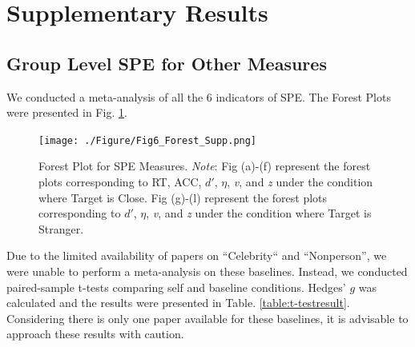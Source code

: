 \documentclass[sn-apa]{sn-jnl}%
\theoremstyle{thmstyleone}%
\theoremstyle{thmstyletwo}%
\theoremstyle{thmstylethree}%
\begin{document}
\section{Supplementary Results}\label{Results}

\subsection{Group Level SPE for Other Measures}\label{sec:meta}
We conducted a meta-analysis of all the 6 indicators of SPE. The Forest Plots were presented in Fig. \ref{fig:Meta_Result}. 
\clearpage
\begin{figure}[!ht]
	\centering
	\texttt{[image: ./Figure/Fig6\_Forest\_Supp.png]}
	\caption[Forest Plot for SPE Measures]{Forest Plot for SPE Measures. \textit{Note}: Fig (a)-(f) represent the forest plots corresponding to RT, ACC, $d'$, $\eta$, \textit{v}, and \textit{z} under the condition where Target is Close. Fig (g)-(l) represent the forest plots corresponding to $d'$, $\eta$, \textit{v}, and \textit{z} under the condition where Target is Stranger.
	}\label{fig:Meta_Result}
\end{figure}
\clearpage

Due to the limited availability of papers on ``Celebrity“ and ``Nonperson”, we were unable to perform a meta-analysis on these baselines. Instead, we conducted paired-sample t-tests comparing self and baseline conditions. Hedges' $g$ was calculated and the results were presented in Table. \ref{table:t-testresult}. Considering there is only one paper available for these baselines, it is advisable to approach these results with caution.


\renewcommand{\thetable}{S\arabic{table}}
\end{document}
